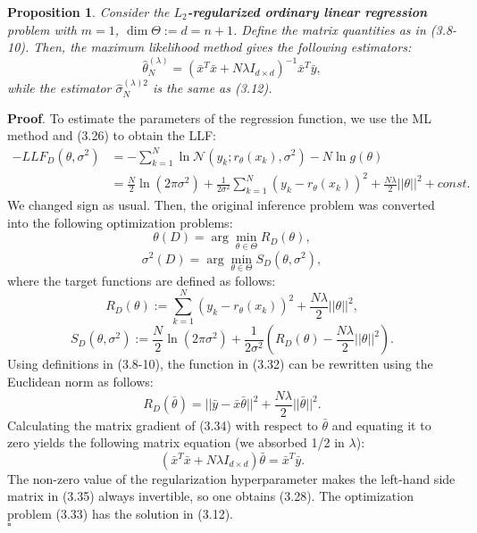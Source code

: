 \documentclass{report}
\newtheorem{proposition}{Proposition}[chapter]
\begin{document}
\begin{proposition}
Consider the \textbf{$L_2$-regularized ordinary linear regression} problem with $m=1$, $\dim \Theta := d = n + 1$. Define the matrix quantities as in (3.8-10). Then, the maximum likelihood method gives the following estimators:
\begin{equation}
\hat{\theta}_N^{(\lambda)} = (\bar{x}^T\bar{x} +N\lambda I_{d\times d})^{-1}\bar{x}^T\bar{y},
\end{equation}
while the estimator $\hat{\sigma}_N^{(\lambda)2}$ is the same as (3.12).
\end{proposition}
\textbf{Proof}. To estimate the parameters of the regression function, we use the ML method and (3.26) to obtain the LLF:
\begin{equation}
\begin{split}
-LLF_{D}(\theta,\sigma^2)&=-\sum_{k=1}^N\ln\mathcal{N}(y_k;r_\theta(x_k),\sigma^2) - N\ln g(\theta)\\
&=\frac{N}{2}\ln(2\pi\sigma^2)+\frac{1}{2\sigma^2}\sum_{k=1}^N(y_k-r_\theta(x_k))^2+\frac{N\lambda}{2}||\theta||^2 + const.
\end{split}
\end{equation}
We changed sign as usual. Then, the original inference problem was converted into the following optimization problems:
\begin{equation}
 \theta(D) = \arg\min_{\theta \in \Theta} R_{D}(\theta),
\end{equation}
\begin{equation}
 \sigma^2(D) = \arg\min_{\theta \in \Theta} S_{D}(\theta,\sigma^2),
\end{equation}
where the target functions are defined as follows:
\begin{equation}
R_{D}(\theta) :=\sum_{k=1}^N(y_k-r_\theta(x_k))^2 + \frac{N\lambda}{2}||\theta||^2,
\end{equation}
\begin{equation}
S_{D}(\theta,\sigma^2) := \frac{N}{2}\ln(2\pi\sigma^2)+\frac{1}{2\sigma^2}\left(R_{D}(\theta)-\frac{N\lambda}{2}||\theta||^2\right).
\end{equation}
Using definitions in (3.8-10), the function in (3.32) can be rewritten using the Euclidean norm as follows:
\begin{equation}
R_{D}(\bar{\theta}) = ||\bar{y} -\bar{x}\bar{\theta}||^2 +\frac{N\lambda}{2}||\bar{\theta}||^2.
\end{equation}
Calculating the matrix gradient of (3.34) with respect to $\bar{\theta}$ and equating it to zero yields the following matrix equation (we absorbed 1/2 in $\lambda$):
\begin{equation}
(\bar{x}^T\bar{x}+ N\lambda I_{d\times d})\bar{\theta} = \bar{x}^T\bar{y}.
\end{equation}
The non-zero value of the regularization hyperparameter makes the left-hand side matrix in (3.35) always invertible, so one obtains (3.28). The optimization problem (3.33) has the solution in (3.12).\\
$\square$\\
\end{document}
